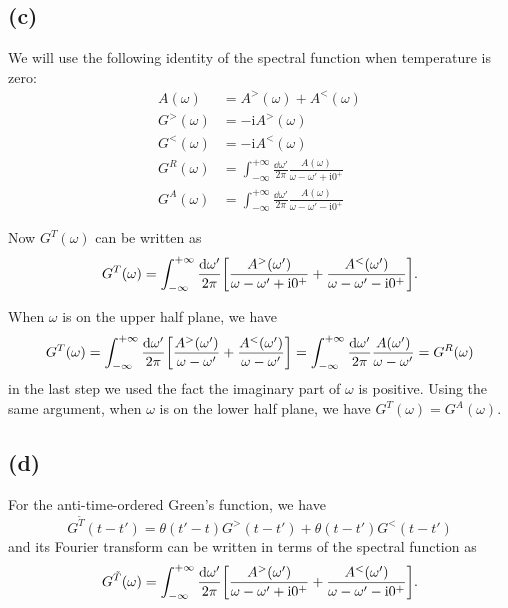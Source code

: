 \documentclass{article}
\newcommand{\ii}{\mathrm{i}}
\begin{document}
\subsection*{(c)}
We will use the following identity of the spectral function when temperature is zero:
\begin{subequations}
    \begin{align}
        A(\omega)&=A^{>}(\omega)+A^{<}(\omega)\\
        G^{>}(\omega)&=-\ii A^{>}(\omega)\\
        G^{<}(\omega)&=-\ii A^{<}(\omega)\\
        G^{R}(\omega)&= \int_{-\infty}^{+\infty}\frac{\dd{\omega'}}{2\pi}\frac{A(\omega)}{\omega-\omega'+\ii0^{+}}\\
        G^{A}(\omega)&= \int_{-\infty}^{+\infty}\frac{\dd{\omega'}}{2\pi}\frac{A(\omega)}{\omega-\omega'-\ii0^{+}}
    \end{align}
\end{subequations}

Now $G^{T}(\omega)$ can be written as
\begin{equation}
    G^{T}(\omega)=\int_{-\infty}^{+\infty}\frac{\dd{\omega'}}{2\pi}\qty[\frac{A^{>}(\omega')}{\omega-\omega'+\ii0^{+}}+\frac{A^{<}(\omega')}{\omega-\omega'-\ii0^{+}}].
\end{equation}

When $\omega$ is on the upper half plane, we have 
\begin{equation}
    G^{T}(\omega)=\int_{-\infty}^{+\infty}\frac{\dd{\omega'}}{2\pi}\qty[\frac{A^{>}(\omega')}{\omega-\omega'}+\frac{A^{<}(\omega')}{\omega-\omega'}]=\int_{-\infty}^{+\infty}\frac{\dd{\omega'}}{2\pi}\frac{A(\omega')}{\omega-\omega'}=G^R(\omega)
\end{equation}
in the last step we used the fact the imaginary part of $\omega$ is positive.
Using the same argument, when $\omega$ is on the lower half plane, we have $G^{T}(\omega)=G^{A}(\omega)$.

\subsection*{(d)}
For the anti-time-ordered Green's function, we have
\begin{equation}
    G^{\tilde{T}}(t-t')=\theta(t'-t)G^{>}(t-t')+\theta(t-t')G^{<}(t-t')
\end{equation}
and its Fourier transform can be written in terms of the spectral function as
\begin{equation}
    G^{\tilde{T}}(\omega)=\int_{-\infty}^{+\infty}\frac{\dd{\omega'}}{2\pi}\qty[\frac{A^{>}(\omega')}{\omega-\omega'+\ii0^{+}}+\frac{A^{<}(\omega')}{\omega-\omega'-\ii0^{+}}].
\end{equation}
\end{document}
